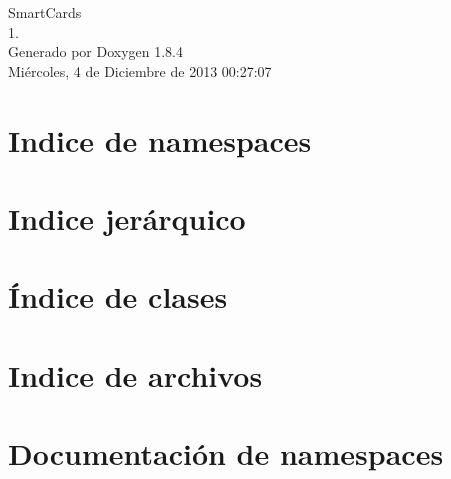 \documentclass[twoside]{book}
\newcommand{\clearemptydoublepage}{%
  \newpage{\pagestyle{empty}\cleardoublepage}%
}
\begin{document}
\hypersetup{pageanchor=false}
\begin{titlepage}
\vspace*{7cm}
\begin{center}%
{\Large Smart\-Cards \\[1ex]\large 1. }\\
\vspace*{1cm}
{\large Generado por Doxygen 1.8.4}\\
\vspace*{0.5cm}
{\small Miércoles, 4 de Diciembre de 2013 00:27:07}\\
\end{center}
\end{titlepage}
\clearemptydoublepage
\tableofcontents
\clearemptydoublepage
{}
\hypersetup{pageanchor=true}

\chapter{Indice de namespaces}

\chapter{Indice jerárquico}

\chapter{Índice de clases}

\chapter{Indice de archivos}

\chapter{Documentación de namespaces}








\end{document}
